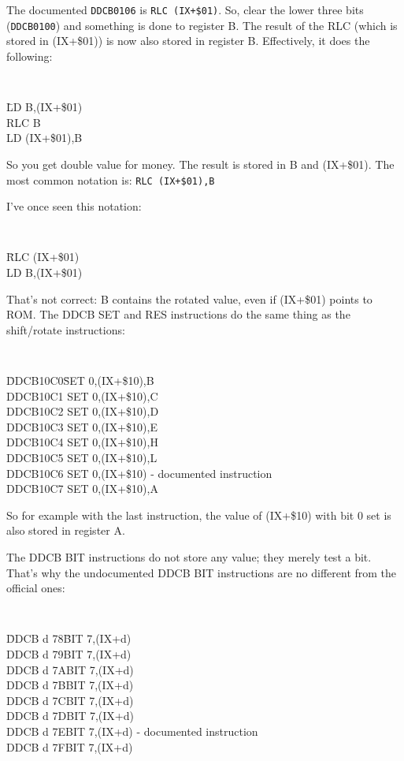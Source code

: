 \documentclass[12pt,twoside,openright,a4paper]{book}
\begin{document}
The documented {\tt DDCB0106} is {\tt RLC (IX+\$01)}. So, clear the lower three bits ({\tt DDCB0100}) and something is done to register B. The result of the RLC (which is stored in (IX+\$01)) is now also stored in register B. Effectively, it does the following:

{\tt 
	\begin{tabbing}
		{\qquad}\=LD B,(IX+\$01)\+\\
		RLC B\\
		LD (IX+\$01),B
	\end{tabbing}
}

So you get double value for money. The result is stored in B and (IX+\$01). The most common notation is: {\tt RLC (IX+\$01),B}

I've once seen this notation:
 
{\tt 
	\begin{tabbing}
		{\qquad}\=RLC (IX+\$01)\+\\
		LD B,(IX+\$01)
	\end{tabbing}
}

That's not correct: B contains the rotated value, even if (IX+\$01) points to ROM. The DDCB SET and RES instructions do the same thing as the shift/rotate instructions:

{\tt 
	\begin{tabbing}
		{\qquad}\=DDCB10C0{\qquad}\=SET 0,(IX+\$10),B\+\\
		DDCB10C1	\>SET 0,(IX+\$10),C\\
		DDCB10C2	\>SET 0,(IX+\$10),D\\
		DDCB10C3	\>SET 0,(IX+\$10),E\\
		DDCB10C4	\>SET 0,(IX+\$10),H\\
		DDCB10C5	\>SET 0,(IX+\$10),L\\
		DDCB10C6	\>SET 0,(IX+\$10) {\rm - documented instruction}\\
		DDCB10C7	\>SET 0,(IX+\$10),A
	\end{tabbing}
}

So for example with the last instruction, the value of (IX+\$10) with bit 0 set is also stored in register A.

The DDCB BIT instructions do not store any value; they merely test a bit. That's why the undocumented DDCB BIT instructions are no different from the official ones:

{\tt 
	\begin{tabbing}
		{\qquad}\=DDCB d 78{\qquad}\=BIT 7,(IX+d)\+\\
		DDCB d 79\>BIT 7,(IX+d)\\
		DDCB d 7A\>BIT 7,(IX+d)\\
		DDCB d 7B\>BIT 7,(IX+d)\\
		DDCB d 7C\>BIT 7,(IX+d)\\
		DDCB d 7D\>BIT 7,(IX+d)\\
		DDCB d 7E\>BIT 7,(IX+d) {\rm - documented instruction}\\
		DDCB d 7F\>BIT 7,(IX+d)
	\end{tabbing}
}
\end{document}
